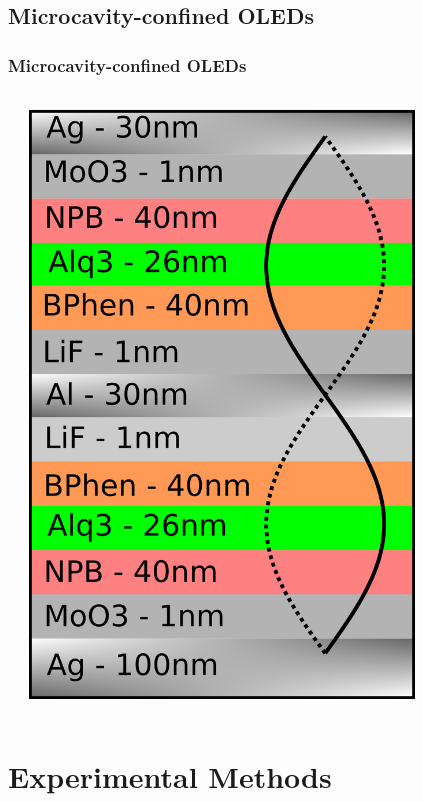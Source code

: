 \documentclass{beamer}
\begin{document}
    \subsection{Microcavity-confined OLEDs}
        \begin{frame}
            \frametitle{Microcavity-confined OLEDs}
            \begin{columns}
				\begin{column}{0.5\textwidth}
				\end{column}
				\begin{column}{0.5\textwidth}
					\centering
					\includegraphics[width=0.8\textwidth]{images/schematic.png}
				\end{column}
            \end{columns}

        \end{frame}
        
\section{Experimental Methods}
    \frame{\tableofcontents[currentsection]}
\end{document}
